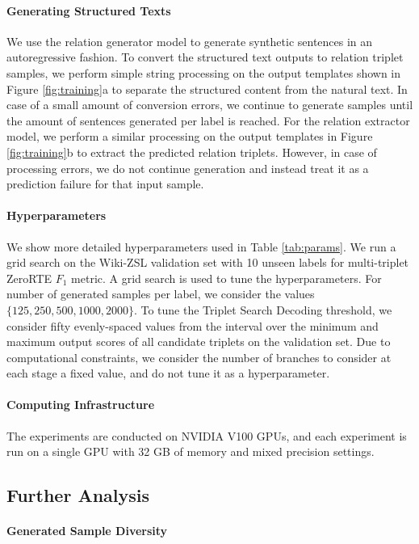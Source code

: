 \documentclass[11pt]{article}
\begin{document}
\paragraph{Generating Structured Texts}
We use the relation generator model to generate synthetic sentences in an autoregressive fashion.
To convert the structured text outputs to relation triplet samples, we perform simple string processing on the output templates shown in Figure \ref{fig:training}a to separate the structured content from the natural text.
In case of a small amount of conversion errors, we continue to generate samples until the amount of sentences generated per label is reached.
For the relation extractor model, we perform a similar processing on the output templates in Figure \ref{fig:training}b to extract the predicted relation triplets.
However, in case of processing errors, we do not continue generation and instead treat it as a prediction failure for that input sample.

\paragraph{Hyperparameters}
We show more detailed hyperparameters used in Table \ref{tab:params}. 
We run a grid search on the Wiki-ZSL validation set with 10 unseen labels for multi-triplet ZeroRTE $F_{1}$ metric.
A grid search is used to tune the hyperparameters.
For number of generated samples per label, we consider the values $\{125, 250, 500, 1000, 2000\}$.
To tune the Triplet Search Decoding threshold, we consider fifty evenly-spaced values from the interval over the minimum and maximum output scores of all candidate triplets on the validation set.
Due to computational constraints, we consider the number of branches to consider at each stage a fixed value, and do not tune it as a hyperparameter.

\paragraph{Computing Infrastructure}
The experiments are conducted on NVIDIA V100 GPUs, and each experiment is run on a single GPU with 32 GB of memory and mixed precision settings.

\subsection{Further Analysis}
\label{sec:further_analysis}
\paragraph{Generated Sample Diversity}
\end{document}
